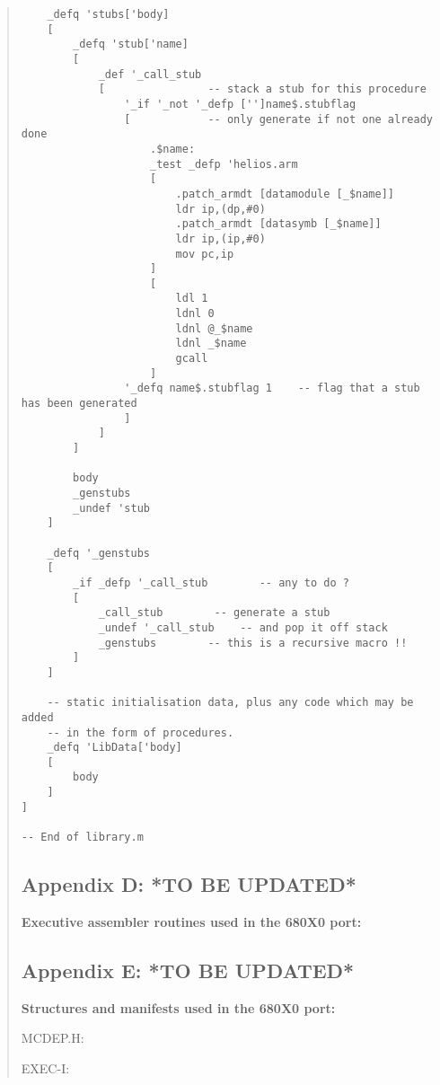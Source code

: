 \begin {quote}
\begin{verbatim}
    _defq 'stubs['body]
    [
        _defq 'stub['name]
        [
            _def '_call_stub
            [                -- stack a stub for this procedure
                '_if '_not '_defp ['']name$.stubflag
                [            -- only generate if not one already done
                    .$name:
                    _test _defp 'helios.arm
                    [
                        .patch_armdt [datamodule [_$name]]
                        ldr ip,(dp,#0)
                        .patch_armdt [datasymb [_$name]]
                        ldr ip,(ip,#0)
                        mov pc,ip
                    ]
                    [
                        ldl 1
                        ldnl 0
                        ldnl @_$name
                        ldnl _$name
                        gcall
                    ]
                '_defq name$.stubflag 1    -- flag that a stub has been generated
                ]
            ]
        ]
    
        body
        _genstubs
        _undef 'stub
    ]

    _defq '_genstubs
    [
        _if _defp '_call_stub        -- any to do ?
        [
            _call_stub        -- generate a stub
            _undef '_call_stub    -- and pop it off stack
            _genstubs        -- this is a recursive macro !!
        ]
    ]

    -- static initialisation data, plus any code which may be added
    -- in the form of procedures.
    _defq 'LibData['body]
    [
        body
    ]
]

-- End of library.m
\end{verbatim}
\normalsize
\vfill
\newpage

\subsection*{Appendix D: *TO BE UPDATED*}

{\bf Executive assembler routines used in the 680X0 port:}


\vfill
\newpage

\subsection*{Appendix E: *TO BE UPDATED*}

{\bf Structures and manifests used in the 680X0 port:}

MCDEP.H:

EXEC-I:
\vfill
\newpage


\end{quote}
